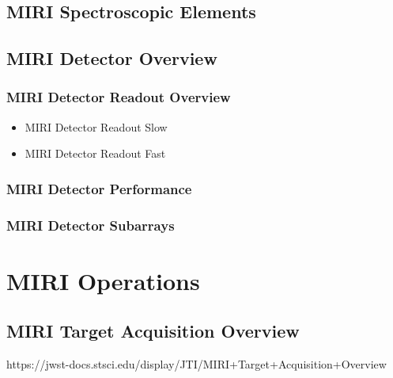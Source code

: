     \subsection{MIRI Spectroscopic Elements}
    \subsection{MIRI Detector Overview}
        \subsubsection{MIRI Detector Readout Overview}
          \begin{itemize}
            \item{MIRI Detector Readout Slow}
            \item{MIRI Detector Readout Fast}
          \end{itemize}
         \subsubsection{MIRI Detector Performance}
         \subsubsection{MIRI Detector Subarrays}


\section{MIRI Operations}
    \subsection{MIRI Target Acquisition Overview}
    https://jwst-docs.stsci.edu/display/JTI/MIRI+Target+Acquisition+Overview
